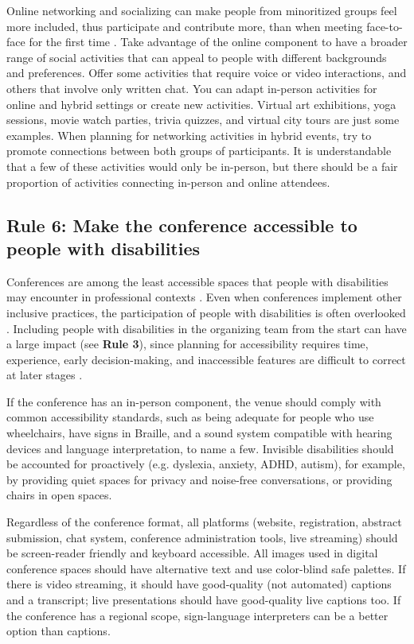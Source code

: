\documentclass[10pt,letterpaper]{article}
\begin{document}
Online networking and socializing can make people from minoritized groups feel more included, thus participate and contribute more, than when meeting face-to-face for the first time \cite{trianaDoesOrderFacetoFace2012,blackEngenderingBelongingThoughtful2020}.
Take advantage of the online component to have a broader range of social activities that can appeal to people with different backgrounds and preferences.
Offer some activities that require voice or video interactions, and others that involve only written chat.
You can adapt in-person activities for online and hybrid settings or create new activities. 
Virtual art exhibitions, yoga sessions, movie watch parties, trivia quizzes, and virtual city tours are just some examples.
When planning for networking activities in hybrid events, try to
promote connections between both groups of participants.
It is understandable that a few of these activities would only be in-person, but 
there should be a fair proportion of activities connecting in-person and online attendees. 


\subsection*{Rule 6: Make the conference accessible to people with disabilities}
\label{rule_accessibility}

Conferences are among the least accessible spaces that people with disabilities may encounter in professional contexts \cite{priceAccessImaginedConstruction2009}. Even when conferences implement other inclusive practices, the participation of people with disabilities is often overlooked \cite{marks2021meeting}. Including people with disabilities in the organizing team from the start can have a large impact (see \textbf{Rule 3}), since planning for accessibility requires time, experience, early decision-making, and inaccessible features are difficult to correct at later stages \cite{irishIncreasingParticipationUsing2020}. 

If the conference has an in-person component, the venue should comply with common accessibility standards, such as being adequate for people who use wheelchairs, have signs in Braille, and a sound system compatible with hearing devices and language interpretation, to name a few. 
Invisible disabilities should be accounted for proactively (e.g. dyslexia, anxiety, ADHD, autism), for example, by providing quiet spaces for privacy and noise-free conversations, or providing chairs in open spaces.

Regardless of the conference format, all platforms (website, registration, abstract submission, chat system, conference administration tools, live streaming) should be screen-reader friendly and keyboard accessible. 
All images used in digital conference spaces should have alternative text and use color-blind safe palettes.
If there is video streaming, it should have good-quality (not automated) captions and a transcript; live presentations should have good-quality live captions too.
If the conference has a regional scope, sign-language interpreters can be a better option than captions.
\end{document}
